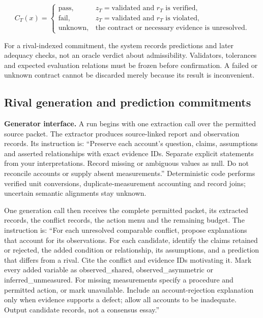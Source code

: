 \documentclass[11pt,a4paper]{article}
\begin{document}
\[
C_T(x)=\begin{cases}
\mathrm{pass},&z_T=\mathrm{validated}\text{ and }r_T\text{ is verified},\\
\mathrm{fail},&z_T=\mathrm{validated}\text{ and }r_T\text{ is violated},\\
\mathrm{unknown},&\text{the contract or necessary evidence is unresolved}.
\end{cases}
\]

For a rival-indexed commitment, the system records predictions and later
adequacy checks, not an oracle verdict about admissibility. Validators,
tolerances and expected evaluation relations must be frozen before
confirmation. A failed or unknown contract cannot be discarded merely
because its result is inconvenient.

\subsection{Rival generation and prediction
commitments}\label{rival-generation-and-prediction-commitments}

\textbf{Generator interface.} A run begins with one extraction call over
the permitted source packet. The extractor produces source-linked report
and observation records. Its instruction is: ``Preserve each account's
question, claims, assumptions and asserted relationships with exact
evidence IDs. Separate explicit statements from your interpretations.
Record missing or ambiguous values as null. Do not reconcile accounts or
supply absent measurements.'' Deterministic code performs verified unit
conversions, duplicate-measurement accounting and record joins;
uncertain semantic alignments stay unknown.

One generation call then receives the complete permitted packet, its
extracted records, the conflict records, the action menu and the
remaining budget. The instruction is: ``For each unresolved comparable
conflict, propose explanations that account for its observations. For
each candidate, identify the claims retained or rejected, the added
condition or relationship, its assumptions, and a prediction that
differs from a rival. Cite the conflict and evidence IDs motivating it.
Mark every added variable as observed\_shared, observed\_asymmetric or
inferred\_unmeasured. For missing measurements specify a procedure and
permitted action, or mark unavailable. Include an account-rejection
explanation only when evidence supports a defect; allow all accounts to
be inadequate. Output candidate records, not a consensus essay.''
\end{document}
